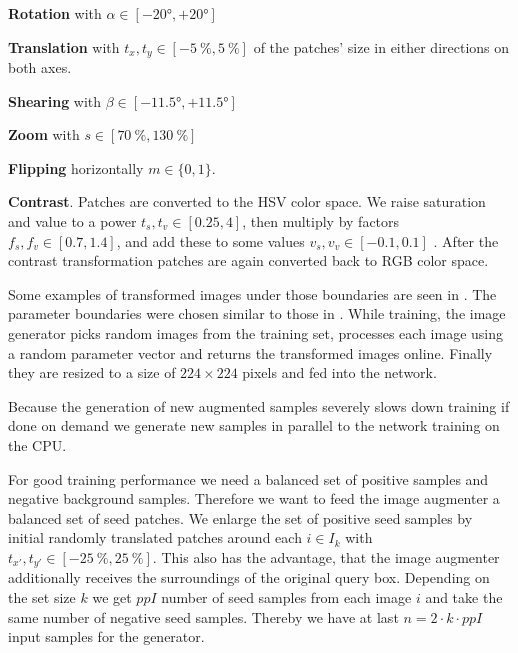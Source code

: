 \begin{my_list_item}
    \item \textbf{Rotation} with $\alpha\in[-\ang{20}, +\ang{20}]$
    \item \textbf{Translation} with $t_x,t_y\in[-\SI{5}{\percent}, \SI{5}{\percent}]$ of the patches' size in either directions on both axes.
    \item \textbf{Shearing} with $\beta\in[-\ang{11.5}, + \ang{11.5}]$
    \item \textbf{Zoom} with $s\in[\SI{70}{\percent}, \SI{130}{\percent}]$
    \item \textbf{Flipping} horizontally $m\in\{0,1\}$.
    \item \textbf{Contrast}. Patches are converted to the HSV color space. We raise saturation and value to a power $t_s, t_v \in [0.25, 4]$, then multiply by factors $f_s, f_v \in [0.7, 1.4]$, and add these to some values $v_s, v_v \in [-0.1, 0.1]$ \citep{dosovitskiy_discriminative_2014}. After the contrast transformation patches are again converted back to RGB color space.
\end{my_list_item}
Some examples of transformed images under those boundaries are seen in . The parameter boundaries were chosen similar to those in \citet{dosovitskiy_discriminative_2014}. While training, the image generator picks random images from the training set, processes each image using a random parameter vector and returns the transformed images online. Finally they are resized to a size of $224\times 224$ pixels and fed into the network.

Because the generation of new augmented samples severely slows down training if done on demand we generate new samples in parallel to the network training on the CPU.

For good training performance we need a balanced set of positive samples and negative background samples. Therefore we want to feed the image augmenter a balanced set of seed patches. We enlarge the set of positive seed samples by initial randomly translated patches around each $i\in I_k$ with $t_{x'},t_{y'}\in[-\SI{25}{\percent}, \SI{25}{\percent}]$. This also has the advantage, that the image augmenter additionally receives the surroundings of the original query box. Depending on the set size $k$ we get $ppI$ number of seed samples from each image $i$ and take the same number of negative seed samples. Thereby we have at last $n = 2\cdot k \cdot ppI$ input samples for the generator.

